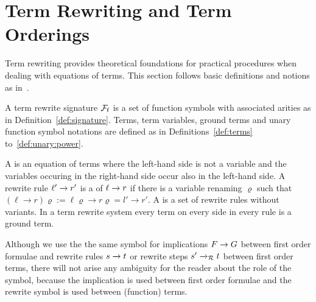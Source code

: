 
\section{Term Rewriting and Term Orderings}\label{sec:termrewriting}

Term rewriting provides theoretical foundations for practical procedures
when dealing with equations of terms.
This section follows basic definitions and notions as in~\cite{AM2015L}.

\begin{definition}\label{def:rewrite:signature}
	A term rewrite signature \( {\mathcal{F}_{\mathsf{f}}} \) is a set of function symbols
	with associated arities
	as in Definition~\ref{def:signature}.
	Terms, term variables, ground terms and unary function symbol notations
	are defined as in Definitions~\ref{def:terms} to~\ref{def:unary:power}.
\end{definition}


\begin{definition}\label{def:rewriterule}
	A  is an equation of terms where the left-hand side is not a variable
	and the variables occuring in the right-hand side occur also in the left-hand side.
	A rewrite rule \( \ell'\xrightarrow[{}]{} r' \) is a  of \( \ell\xrightarrow[{}]{} r \) if there is a variable renaming \( \varrho \)
	such that
	\( (\ell\rightarrow r)\varrho := \ell\varrho\rightarrow r\varrho = l'\rightarrow r' \).
	A  is a set of rewrite rules without variants.
	In a  term rewrite system every term on every side in every rule is a ground term.
\end{definition}

Although we use the the same symbol for implications \( F\rightarrow G \) between first order formulae
and rewrite rules \( s\xrightarrow[{}]{} t \) or rewrite steps \( s'\xrightarrow[{}]{}_{\mathcal{R}} t \) between first order terms,
there will not arise any ambiguity for the reader about the role of the symbol,
because the implication is used between first order formulae
and the rewrite symbol is used between (function) terms.

